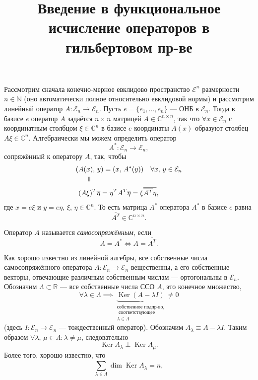 \documentclass[a4paper]{article}
\title{Введение в функциональное исчисление операторов в гильбертовом пр-ве}
\begin{document}
	\maketitle
Рассмотрим сначала конечно-мерное евклидово пространство $\mathcal{E}^n$ размерности $n \in \mathbb{N}$ 
(оно автоматически  полное относительно евклидовой нормы)
и рассмотрим линейный оператор $A : \mathcal{E}_n\to \mathcal{E}_n$.
Пусть $e=\{e_1,\ldots,e_n\} $ --- ОНБ в $\mathcal{E}_n$. Тогда в базисе $e$ оператор $A$ задаётся $n \times n$ 
матрицей $A \in  \mathbb{C}^{n \times n}$, так что $\forall x \in  \mathcal{E}_n$
с координатным  столбцом $\xi \in  \mathbb{C}^n$ в базисе $e$ координаты $A(x)$ 
образуют столбец $A \xi \in  \mathbb{C}^n$.
Алгебраически мы можем определить оператор
\[
	A^* : \mathcal{E}_n \to  \mathcal{E}_n
 ,\]
 сопряжённый к оператору $A$, так, чтобы
 \begin{align*}
	 (A(&x),\,y)= (x,\, A^* (y)) \quad \forall x,\, y \in \mathcal{E}_n\\
	    & \veq\\
	 (A &\xi)^T \overline{\eta}= \eta^T A^T \overline{\eta} = \xi \overline{\overline{
	 A^T}\eta},
 \end{align*} 
 где $x= e \xi$ и $y = e \eta$, $\xi,\,\eta \in \mathbb{C}^n$.
 То есть матрица $A^*$ оператора  $A^*$ в базисе $e$ равна
 \[
	 \overline{A^T} \in  \mathbb{C}^{n \times n}
 .\] 
\begin{dfn}
Оператор $A$ называется \emph{самосопряжённым}, если
\[
A=A^* \Leftrightarrow A= \overline{A^T}
.\] 
\end{dfn} 
Как хорошо известно из линейной алгебры, все собственные
числа самосопряжённого оператора $A: \mathcal{E}_n \to  \mathcal{E}_n$ вещественны, а его собственные векторы, отвечающие различным
собственным числам --- ортогональны в $\mathcal{E}_n$.
Обозначим $\Lambda \subset \mathbb{R}$ --- все собственные
числа ССО $A$, это конечное множество,
\[
	\forall \lambda \in \Lambda \implies \underbrace{\operatorname{Ker}
(A- \lambda I)}_{\substack{\text{собственное
подпр-во,}\\ \text{ соответствующее}\\
\lambda \in \Lambda}} \neq 0
\] 
(здесь $I : \mathcal{E}_n \to \mathcal{E}_n$  --- тождественный
оператор). Обозначим $A_\lambda\equiv A- \lambda I$.
Таким образом $\forall \lambda,\,\mu \in \Lambda : \lambda \neq
 \mu$, следовательно
\[
	\operatorname{Ker} A_\lambda \perp \operatorname{Ker}
	A_\mu
.\] 
Более того, хорошо известно, что
\[
\sum_{\lambda \in \Lambda}^{} \dim  \operatorname{Ker}
A_\lambda = n,
\]
\end{document}
